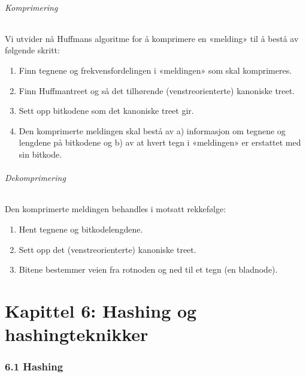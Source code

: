 \documentclass[11pt]{article}
\begin{document}
        \paragraph{Komprimering} Vi utvider nå Huffmans algoritme for å komprimere en «melding» til å bestå
        av følgende skritt:
            \begin{enumerate}
                \item Finn tegnene og frekvensfordelingen i «meldingen» som skal komprimeres.
                \item Finn Huffmantreet og så det tilhørende (venstreorienterte) kanoniske treet.
                \item Sett opp bitkodene som det kanoniske treet gir.
                \item Den komprimerte meldingen skal bestå av a) informasjon om tegnene og lengdene på
                    bitkodene og b) av at hvert tegn i «meldingen» er erstattet med sin bitkode.
            \end{enumerate}

        \paragraph{Dekomprimering} Den komprimerte meldingen behandles i motsatt rekkefølge:
            \begin{enumerate}
                \item Hent tegnene og bitkodelengdene.
                \item Sett opp det (venstreorienterte) kanoniske treet.
                \item Bitene bestemmer veien fra rotnoden og ned til et tegn (en bladnode).
            \end{enumerate}


\newpage
\part{Kapittel 6: Hashing og hashingteknikker}

\section{6.1 Hashing}
\end{document}
